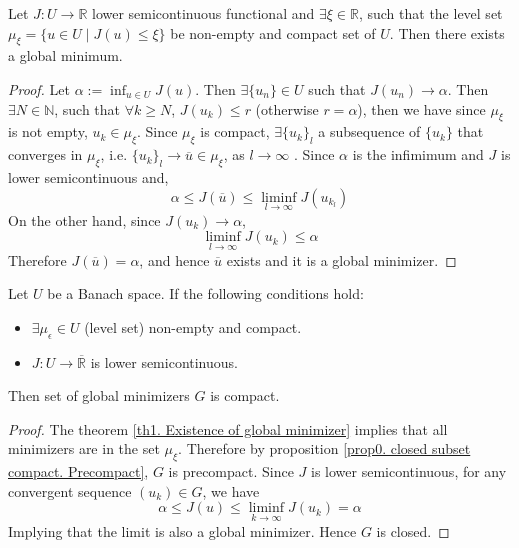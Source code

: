 \begin{theorem}
	Let $J: U\rightarrow \mathbb{R}$ lower semicontinuous functional and $\exists \xi \in \mathbb{R}$, such that the level set $\mu_\xi=\{ u \in U \mid J(u)\leq \xi\}$ be non-empty and compact set of $U$. Then there exists a global minimum.
	\begin{proof}
		Let $\alpha := \inf_{u\in U} J(u)$. Then $\exists \{u_n\} \in U $ such that $J(u_n) \rightarrow \alpha$. Then  $\exists N\in \mathbb{N}$, such that $\forall k \geq N$,  $J(u_k) \leq r$ (otherwise $r=\alpha$), then we have since $\mu_\xi$ is not empty, $u_k \in \mu_\xi$. Since $\mu_\xi$ is compact,  $\exists \{u_k\}_l$ a subsequence of $\{u_k\}$ that converges in $\mu_\xi$, i.e. $\{u_k\}_l \rightarrow \overline{u} \in \mu_\xi$, as $l \rightarrow \infty$	. Since $\alpha$ is the infimimum and $J$ is lower semicontinuous and,
		 \[\alpha \leq J(\overline{u}) \leq \liminf_{l\rightarrow \infty} J(u_{k_l}) \]
		 On the other hand,  since $J(u_k) \rightarrow \alpha$,
		 \[
		  \liminf_{l\rightarrow \infty} J(u_k) \leq \alpha
		 \]
		 Therefore $J(\overline{u})=\alpha$, and hence $\overline{u}$ exists and it is a global minimizer.
	\end{proof}
	\label{th1. Existence of global minimizer}
\end{theorem}
\begin{corollary}
	Let $U$ be a Banach space. If the following conditions hold:
	\begin{itemize}
		\item $\exists \mu_\epsilon \in U$ (level set) non-empty and compact.
		\item $J: U \rightarrow \overline{\mathbb{R}}$ is lower semicontinuous. 
	\end{itemize}
	Then set of global minimizers  $G$ is compact.
	\begin{proof}
		The theorem \ref{th1. Existence of global minimizer} implies that all minimizers are in the set $\mu_\xi$. Therefore by proposition \ref{prop0. closed subset compact. Precompact}, $G$ is precompact. Since $J$ is lower semicontinuous, for any convergent sequence $(u_k) \in G$, we have
		\[
			\alpha \leq J(u) \leq \liminf_{k\rightarrow\infty} J(u_k)=\alpha
		\]
		Implying that the limit is also a global minimizer. Hence $G$ is closed.
	\end{proof}
\end{corollary}
